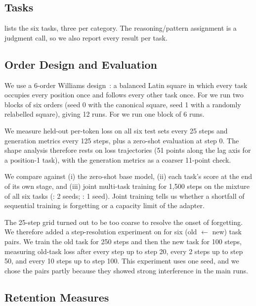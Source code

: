 \subsection{Tasks}

 lists the six tasks, three per category.
The reasoning/pattern assignment is a judgment call, so we also report every result per task.



\subsection{Order Design and Evaluation}

We use a 6-order Williams design~\cite{williams1949experimental}: a balanced Latin square in which every task occupies every position once and follows every other task once.
For \llama we run two blocks of six orders (seed 0 with the canonical square, seed 1 with a randomly relabelled square), giving 12 runs.
For \qwen we run one block of 6 runs.

We measure held-out per-token loss on all six test sets every 25 steps and generation metrics every 125 steps, plus a zero-shot evaluation at step 0.
The shape analysis therefore rests on loss trajectories (51 points along the lag axis for a position-1 task), with the generation metrics as a coarser 11-point check.

We compare against (i) the zero-shot base model, (ii) each task's score at the end of its own stage, and (iii) joint multi-task training for 1{,}500 steps on the mixture of all six tasks (\llama: 2 seeds; \qwen: 1 seed).
Joint training tells us whether a shortfall of sequential training is forgetting or a capacity limit of the adapter.

The 25-step grid turned out to be too coarse to resolve the onset of forgetting.
We therefore added a step-resolution experiment on \llama for six (old $\leftarrow$ new) task pairs.
We train the old task for 250 steps and then the new task for 100 steps, measuring old-task loss after every step up to step 20, every 2 steps up to step 50, and every 10 steps up to step 100.
This experiment uses one seed, and we chose the pairs partly because they showed strong interference in the main runs.

\subsection{Retention Measures}

